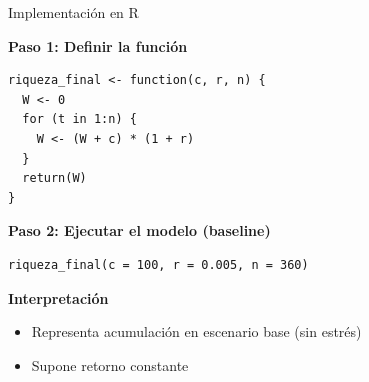 \documentclass[10pt]{beamer}
\begin{document}
\begin{frame}[fragile]{Implementación en R}

\textbf{Paso 1: Definir la función}

\begin{lstlisting}
riqueza_final <- function(c, r, n) {
  W <- 0
  for (t in 1:n) {
    W <- (W + c) * (1 + r)
  }
  return(W)
}
\end{lstlisting}

\vspace{0.4cm}

\textbf{Paso 2: Ejecutar el modelo (baseline)}

\begin{lstlisting}
riqueza_final(c = 100, r = 0.005, n = 360)
\end{lstlisting}

\vspace{0.3cm}

\textbf{Interpretación}
\begin{itemize}
\item Representa acumulación en escenario base (sin estrés)
\item Supone retorno constante
\end{itemize}

\end{frame}
\end{document}

